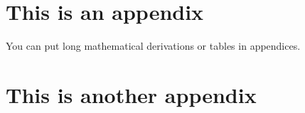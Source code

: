 \documentclass[12pt]{report}
\begin{document}



\begin{appendix}

\chapter{This is an appendix}

You can put long mathematical derivations or tables in appendices.

\chapter{This is another appendix}

\end{appendix}
\end{document}
